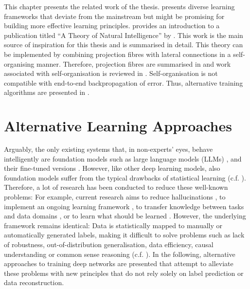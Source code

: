 This chapter presents the related work of the thesis.  presents diverse learning frameworks that deviate from the mainstream but might be promising for building more effective learning principles.  provides an introduction to a publication titled ``A Theory of Natural Intelligence'' by . This work is the main source of inspiration for this thesis and is summarised in detail.
This theory can be implemented by combining projection fibres with lateral connections in a self-organising manner. Therefore, projection fibres are summarised in  and work associated with self-organisation is reviewed in . Self-organisation is not compatible with end-to-end backpropagation of error. Thus, alternative training algorithms are presented in . %


\section{Alternative Learning Approaches}
Arguably, the only existing systems that, in non-experts' eyes, behave intelligently are foundation models such as large language models (LLMs) , and their fine-tuned versions . However, like other deep learning models, also foundation models suffer from the typical drawbacks of statistical learning (c.f. ). Therefore, a lot of research has been conducted to reduce these well-known problems: For example, current research aims to reduce hallucinations , to implement an ongoing learning framework \cite{sahoo_online_2018, hoi_online_2021}, to transfer knowledge between tasks and data domains \cite{zhuang_comprehensive_2021, sager_unsupervised_2022}, or to learn what should be learned \cite{thrun_learning_1998, hospedales_meta-learning_2021}. However, the underlying framework remains identical: Data is statistically mapped to manually or automatically generated labels, making it difficult to solve problems such as lack of robustness,  out-of-distribution generalisation, data efficiency, causal understanding or common sense reasoning (c.f. ). In the following, alternative approaches to training deep networks are presented that attempt to alleviate these problems with new principles that do not rely solely on label prediction or data reconstruction. 

